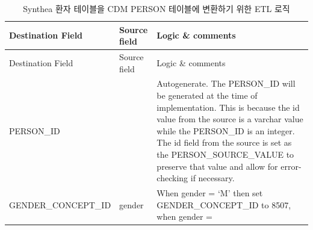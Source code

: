 \documentclass[11pt]{book}
\theoremstyle{definition}
\theoremstyle{definition}
\theoremstyle{definition}
\theoremstyle{remark}
\begin{document}
\begin{longtable}[]{@{}lll@{}}
\caption{\label{tab:syntheaEtlPerson} Synthea 환자 테이블을 CDM PERSON
테이블에 변환하기 위한 ETL 로직}\tabularnewline
\toprule
\begin{minipage}[b]{0.28\columnwidth}\raggedright\strut
Destination Field\strut
\end{minipage} & \begin{minipage}[b]{0.13\columnwidth}\raggedright\strut
Source field\strut
\end{minipage} & \begin{minipage}[b]{0.50\columnwidth}\raggedright\strut
Logic \& comments\strut
\end{minipage}\tabularnewline
\midrule
\endfirsthead
\toprule
\begin{minipage}[b]{0.28\columnwidth}\raggedright\strut
Destination Field\strut
\end{minipage} & \begin{minipage}[b]{0.13\columnwidth}\raggedright\strut
Source field\strut
\end{minipage} & \begin{minipage}[b]{0.50\columnwidth}\raggedright\strut
Logic \& comments\strut
\end{minipage}\tabularnewline
\midrule
\endhead
\begin{minipage}[t]{0.28\columnwidth}\raggedright\strut
PERSON\_ID\strut
\end{minipage} & \begin{minipage}[t]{0.13\columnwidth}\raggedright\strut
\strut
\end{minipage} & \begin{minipage}[t]{0.50\columnwidth}\raggedright\strut
Autogenerate. The PERSON\_ID will be generated at the time of
implementation. This is because the id value from the source is a
varchar value while the PERSON\_ID is an integer. The id field from the
source is set as the PERSON\_SOURCE\_VALUE to preserve that value and
allow for error-checking if necessary.\strut
\end{minipage}\tabularnewline
\begin{minipage}[t]{0.28\columnwidth}\raggedright\strut
GENDER\_CONCEPT\_ID\strut
\end{minipage} & \begin{minipage}[t]{0.13\columnwidth}\raggedright\strut
gender\strut
\end{minipage} & \begin{minipage}[t]{0.50\columnwidth}\raggedright\strut
When gender = `M' then set GENDER\_CONCEPT\_ID to 8507, when gender =

\end{minipage}
\end{longtable}
\end{document}
